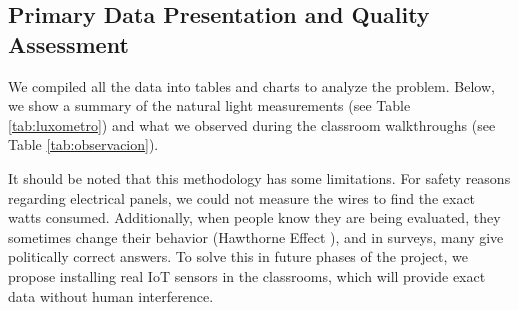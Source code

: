\documentclass[conference]{IEEEtran}
\begin{document}
\subsection{Primary Data Presentation and Quality Assessment}

We compiled all the data into tables and charts to analyze the problem. Below, we show a summary of the natural light measurements (see Table \ref{tab:luxometro}) and what we observed during the classroom walkthroughs (see Table \ref{tab:observacion}).

\begin{table}[H]
    \centering
    \caption{Sample Lux Meter and Environmental Correlation Data}
    \label{tab:luxometro}
\end{table}

\begin{table}[H]
    \centering
    \caption{Excerpt of Data Collected by Direct Observation}
    \label{tab:observacion}
\end{table}

It should be noted that this methodology has some limitations. For safety reasons regarding electrical panels, we could not measure the wires to find the exact watts consumed. Additionally, when people know they are being evaluated, they sometimes change their behavior (Hawthorne Effect \cite{b4}), and in surveys, many give politically correct answers. To solve this in future phases of the project, we propose installing real IoT sensors in the classrooms, which will provide exact data without human interference.
\end{document}
